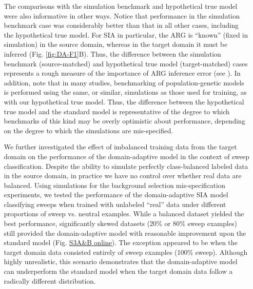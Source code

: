 The comparisons with the simulation benchmark and hypothetical true model were also informative in other ways. Notice that performance in the simulation benchmark case was considerably better than that in all other cases, including the hypothetical true model. For \ac{SIA} in particular, the \ac{ARG} is “known” (fixed in simulation) in the source domain, whereas in the target domain it must be inferred (Fig. \ref{fig:DA-F1}B). Thus, the difference between the simulation benchmark (source-matched) and hypothetical true model (target-matched) cases represents a rough measure of the importance of \ac{ARG} inference error (see ). In addition, note that in many studies, benchmarking of population-genetic models is performed using the same, or similar, simulations as those used for training, as with our hypothetical true model. Thus, the difference between the hypothetical true model and the standard model is representative of the degree to which benchmarks of this kind may be overly optimistic about performance, depending on the degree to which the simulations are mis-specified.

We further investigated the effect of imbalanced training data from the target domain on the performance of the domain-adaptive model in the context of sweep classification. Despite the ability to simulate perfectly class-balanced labeled data in the source domain, in practice we have no control over whether real data are balanced. Using simulations for the background selection mis-specification experiments, we tested the performance of the domain-adaptive \ac{SIA} model classifying sweeps when trained with unlabeled “real” data under different proportions of sweep vs. neutral examples. While a balanced dataset yielded the best performance, significantly skewed datasets (20\% or 80\% sweep examples) still provided the domain-adaptive model with reasonable improvement upon the standard model (Fig. \href{https://journals.plos.org/plosgenetics/article?id=10.1371/journal.pgen.1011032\#sec018}{S3A\&B online}). The exception appeared to be when the target domain data consisted entirely of sweep examples (100\% sweep). Although highly unrealistic, this scenario demonstrates that the domain-adaptive model can underperform the standard model when the target domain data follow a radically different distribution.

